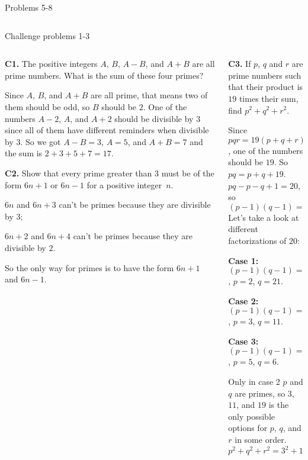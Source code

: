\documentclass[9pt,aspectratio=169,handout]{beamer}
\begin{document}
\begin{frame}{Problems 5-8}
\begin{columns}[T]
\begin{column}{0.5\textwidth}
    \end{column}
  \end{columns}
\end{frame}

\begin{frame}{Challenge problems 1-3}
  \begin{columns}[T]
    \begin{column}{0.5\textwidth}
      \begin{problem}
          \textbf{C1.} The positive integers $A$, $B$, $A-B$, and $A+B$ are all prime numbers. What is the sum of these four primes?
      \end{problem}\pause
      Since $A$, $B$, and $A + B$ are all prime, that means two of them should be odd, so $B$ should be $2$. One of the numbers $A - 2$, $A$, and $A + 2$ should be divisible by $3$ since all of them have different reminders when divisible by $3$. So we got $A - B = 3$, $A = 5$, and $A + B = 7$ and the sum is $2 + 3 + 5 + 7 = \boxed{17}$.\pause

      \begin{problem}
        \textbf{C2.} Show that every prime greater than $3$ must be of the form $6n+1$ or $6n-1$ for a positive integer~$n$.
      \end{problem}\pause
      $6n$ and $6n + 3$ can't be primes because they are divisible by $3$;
      
      $6n + 2$ and $6n + 4$  can't be primes because they are divisible by $2$.

      So the only way for primes is to have the form $6n+1$ and $6n-1$.\pause
    \end{column}
    \begin{column}{0.5\textwidth}
      \begin{problem}
        \textbf{C3.} If $p$, $q$ and $r$ are prime numbers such that their product is $19$ times their sum, find $p^2 + q^2 + r^2$.
      \end{problem}\pause
      Since $pqr = 19(p + q + r)$, one of the numbers should be $19$. So $pq = p + q + 19$. $pq - p - q + 1 = 20$, so \[(p - 1)(q - 1) = 20.\]
      Let's take a look at different factorizations of $20$:\pause

      \textbf{Case 1:} $(p - 1)(q - 1) = 1 \times 20$, $p = 2$, $q = 21$.

      \textbf{Case 2:} $(p - 1)(q - 1) = 2 \times 10$, $p = 3$, $q = 11$.

      \textbf{Case 3:} $(p - 1)(q - 1) = 4 \times 5$, $p = 5$, $q = 6$.

      Only in case 2 $p$ and $q$ are primes, so $3$, $11$, and $19$ is the only possible options for $p$, $q$, and $r$ in some order. 
      \[ p^2 + q^2 + r^2 = 3^2 + 11^2 + 19^2 = \boxed{491}.\]
    \end{column}
  \end{columns}
\end{frame}
\end{document}
